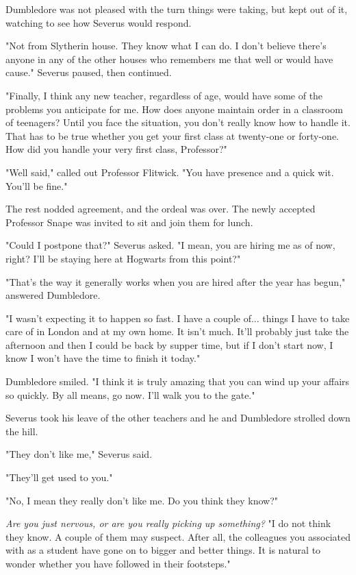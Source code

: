 Dumbledore was not pleased with the turn things were taking, but kept out of it, watching to see how Severus would respond.

"Not from Slytherin house. They know what I can do. I don't believe there's anyone in any of the other houses who remembers me that well or would have cause." Severus paused, then continued.

"Finally, I think any new teacher, regardless of age, would have some of the problems you anticipate for me. How does anyone maintain order in a classroom of teenagers? Until you face the situation, you don't really know how to handle it. That has to be true whether you get your first class at twenty-one or forty-one. How did you handle your very first class, Professor?"

"Well said," called out Professor Flitwick. "You have presence and a quick wit. You'll be fine."

The rest nodded agreement, and the ordeal was over. The newly accepted Professor Snape was invited to sit and join them for lunch.

"Could I postpone that?" Severus asked. "I mean, you are hiring me as of now, right? I'll be staying here at Hogwarts from this point?"

"That's the way it generally works when you are hired after the year has begun," answered Dumbledore.

"I wasn't expecting it to happen so fast. I have a couple of... things I have to take care of in London and at my own home. It isn't much. It'll probably just take the afternoon and then I could be back by supper time, but if I don't start now, I know I won't have the time to finish it today."

Dumbledore smiled. "I think it is truly amazing that you can wind up your affairs so quickly. By all means, go now. I'll walk you to the gate."

Severus took his leave of the other teachers and he and Dumbledore strolled down the hill.

"They don't like me," Severus said.

"They'll get used to you."

"No, I mean they really don't like me. Do you think they know?"

\emph{Are you just nervous, or are you really picking up something?} "I do not think they know. A couple of them may suspect. After all, the colleagues you associated with as a student have gone on to bigger and better things. It is natural to wonder whether you have followed in their footsteps."

